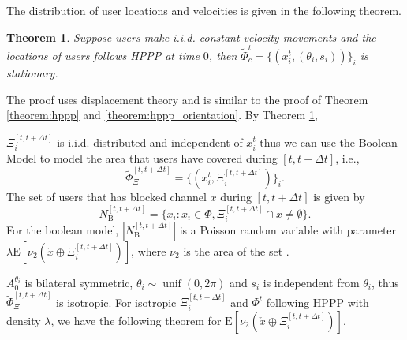 \documentclass[10pt, conference, letterpaper]{IEEEtran}
\newtheorem{theorem}{Theorem}
\DeclareMathOperator*{\unif}{unif}
\begin{document}
The distribution of user locations and velocities is given in the following theorem.
\begin{theorem}\label{theorem:boolean_stationary}
Suppose users make i.i.d. constant velocity movements and the locations of users follows HPPP at time $0$, then $\tilde{\Phi}_c^t = \{(x_i^t, (\theta_i, s_i))\}_i$ is stationary.
\end{theorem}
The proof uses displacement theory and is similar to the proof of Theorem \ref{theorem:hppp} and \ref{theorem:hppp_orientation}.
By Theorem \ref{theorem:boolean_stationary}, 

$\Xi_i^{[t, t+\Delta t]}$ is i.i.d. distributed and independent of $x_i^t$ thus we can use the Boolean Model \cite{stochasticgeometry} to model the area that users have covered during $[t, t+\Delta t]$, i.e., 
\begin{equation*}
\tilde{\Phi}_{\Xi}^{[t, t+\Delta t]} = \{(x_i^t, \Xi_i^{[t, t+\Delta t]})\}_i.
\end{equation*}
The set of users that has blocked channel $x$ during $[t, t+\Delta t]$ is given by
\begin{equation*}
N_{\mathrm{B}}^{[t, t + \Delta t]} = \{x_i:x_i \in \Phi, \Xi_i^{[t, t+\Delta t]}\cap x \neq \emptyset \}.
\end{equation*}
For the boolean model, $|N_{\mathrm{B}}^{[t, t + \Delta t]}|$ is a Poisson random variable with parameter $\lambda\mathrm{E}[\nu_2(\check{x}\oplus \Xi_i^{[t, t+\Delta t]})]$, where $\nu_2$ is the area of the set \cite{stochasticgeometry}.

$A_0^{\theta_i}$ is bilateral symmetric, $\theta_i\sim\unif(0, 2\pi)$ and $s_i$ is independent from $\theta_i$, thus $\tilde{\Phi}_{\Xi}^{[t, t+\Delta t]}$ is isotropic. For isotropic $\Xi_i^{[t, t+\Delta t]}$ and $\Phi^t$ following HPPP with density $\lambda$, we have the following theorem for $\mathrm{E}[\nu_2(\check{x}\oplus\Xi_i^{[t, t+\Delta t]})]$.
\end{document}
